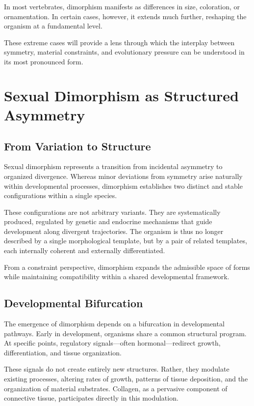 \documentclass[11pt,oneside]{book}
\begin{document}
In most vertebrates, dimorphism manifests as differences in size, coloration, or ornamentation. In certain cases, however, it extends much further, reshaping the organism at a fundamental level.

These extreme cases will provide a lens through which the interplay between symmetry, material constraints, and evolutionary pressure can be understood in its most pronounced form.

\chapter{Sexual Dimorphism as Structured Asymmetry}

\section{From Variation to Structure}

Sexual dimorphism represents a transition from incidental asymmetry to organized divergence. Whereas minor deviations from symmetry arise naturally within developmental processes, dimorphism establishes two distinct and stable configurations within a single species.

These configurations are not arbitrary variants. They are systematically produced, regulated by genetic and endocrine mechanisms that guide development along divergent trajectories. The organism is thus no longer described by a single morphological template, but by a pair of related templates, each internally coherent and externally differentiated.

From a constraint perspective, dimorphism expands the admissible space of forms while maintaining compatibility within a shared developmental framework.

\section{Developmental Bifurcation}

The emergence of dimorphism depends on a bifurcation in developmental pathways. Early in development, organisms share a common structural program. At specific points, regulatory signals—often hormonal—redirect growth, differentiation, and tissue organization.

These signals do not create entirely new structures. Rather, they modulate existing processes, altering rates of growth, patterns of tissue deposition, and the organization of material substrates. Collagen, as a pervasive component of connective tissue, participates directly in this modulation.
\end{document}
